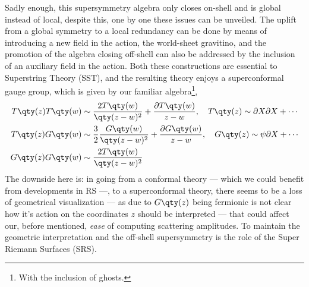 Sadly enough, this supersymmetry algebra only closes on-shell and is global instead of local, despite this, 
one by one these issues can be unveiled. The uplift from a global symmetry to a local redundancy can be 
done by means of introducing a new field in the action, the world-sheet gravitino, and the promotion of the 
algebra closing off-shell can also be addressed by the inclusion of an auxiliary field in the action. Both 
these constructions are essential to Superstring Theory (SST), and the resulting theory enjoys a superconformal gauge 
group, which is given by our familiar algebra\footnote{With the inclusion of ghosts.},
\begin{align*}
    T\qty(z)T\qty(w)&\sim\frac{2T\qty(w)}{\qty(z-w)^2}+\frac{\partial T\qty(w)}{z-w},\ \ \ T\qty(z)\sim\partial X\partial X+\cdots\\
    T\qty(z)G\qty(w)&\sim\frac32\frac{G\qty(w)}{\qty(z-w)^2}+\frac{\partial G\qty(w)}{z-w},\ \ \ G\qty(z)\sim\psi\partial X+\cdots\\
    G\qty(z)G\qty(w)&\sim\frac{2T\qty(w)}{\qty(z-w)^2}
\end{align*}
The downside here is: in going from a conformal theory --- which we could benefit from developments in RS ---, 
to a superconformal theory, there seems to be a loss of geometrical visualization --- as due to $G\qty(z)$ 
being fermionic is not clear how it's action on the coordinates $z$ should be interpreted --- that could affect our, before 
mentioned, \textit{ease} of computing scattering amplitudes. To maintain the geometric interpretation and 
the off-shell supersymmetry is the role of the Super Riemann Surfaces (SRS).